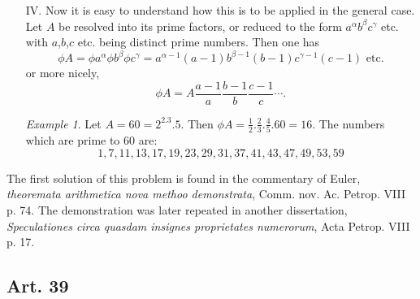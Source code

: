 \documentclass{book}
\theoremstyle{plain}
\theoremstyle{remark}
\newtheorem*{example}{Example}
\begin{document}
\begin{itemize}
\item[IV.] Now it is easy to understand how this is to be applied in the general case. Let $A$ be resolved into its prime factors, or reduced to the form $a^{\alpha}b^{\beta}c^{\gamma}$ etc. with $a$,$b$,$c$ etc. being distinct prime numbers.  Then one has
\[ \phi A = \phi a^\alpha \phi b^{\beta} \phi c^{\gamma} = a^{\alpha-1}(a-1) b^{\beta-1}(b-1)c^{\gamma-1}(c-1) \textrm{ etc.} \]
or more nicely,
\[ \phi A = A \frac{a-1}{a} \frac{b-1}{b} \frac{c-1}{c} \cdots. \]
\begin{example} Let $A = 60=2^2.3.5$.  Then $\phi A = \frac{1}{2} . \frac{2}{3} . \frac{4}{5} . 60 = 16$.  The numbers which are prime to $60$ are:
 \[ 1,7,11,13,17,19,23,29,31,37,41,43,47,49,53,59 \]
\end{example}
\end{itemize}
The first solution of this problem is found in the commentary of Euler, \textit{theoremata arithmetica nova methoo demonstrata}, Comm. nov. Ac. Petrop. VIII p. 74.  The demonstration was later repeated in another dissertation, \textit{Speculationes circa quasdam insignes proprietates numerorum}, Acta Petrop. VIII p. 17. 

\subsection*{Art. 39} 
\end{document}
